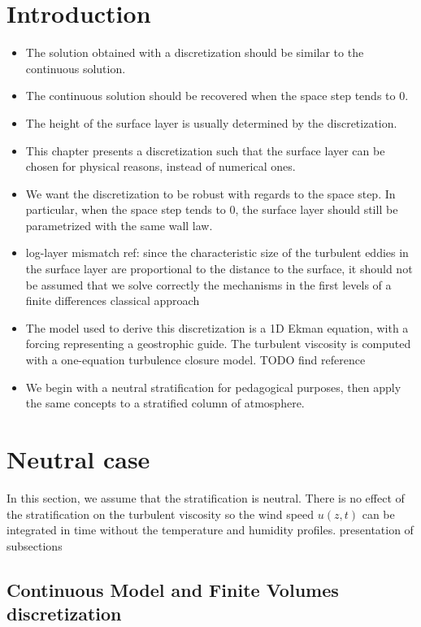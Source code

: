 \tableofcontents
\section{Introduction}
\begin{itemize}
\item The solution obtained with a discretization
	should be similar to the continuous solution.
\item The continuous solution should be recovered when
	the space step tends to 0.
\item The height of the surface layer
	is usually determined by the discretization.
\item This chapter presents a discretization such that
	the surface layer can be chosen for physical reasons,
		instead of numerical ones.
\item We want the discretization to be robust with regards to
	the space step. In particular, when the space step
		tends to 0, the surface layer should still
		be parametrized with the same wall law.
\item {\color{red} log-layer mismatch ref: since the characteristic
	size of the turbulent eddies in the surface layer are
		proportional to the distance to the surface,
		it should not be assumed that we solve
		correctly the mechanisms in the first levels
		of a finite differences classical approach}
\item The model used to derive this discretization is a 1D Ekman
	equation, with a forcing representing a geostrophic guide.
		The turbulent viscosity is computed with a
		one-equation turbulence closure model.
		{\color{red} TODO find reference}
\item We begin with a neutral stratification for pedagogical purposes,
	then apply the same concepts to a stratified column of
		atmosphere.
\end{itemize}
\section{Neutral case}
In this section, we assume that the stratification is neutral.
There is no effect of the stratification on the turbulent viscosity
so the wind speed $u(z, t)$ can be integrated in time
without the temperature and humidity profiles.
{\color{red} presentation of subsections}
\subsection{Continuous Model and Finite Volumes discretization}
